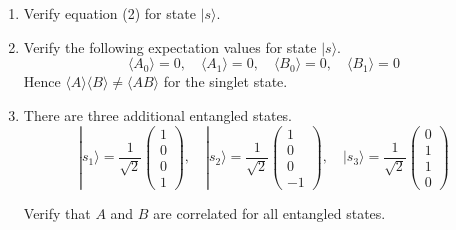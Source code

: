 \begin{enumerate}

\item
Verify equation (2) for state $|s\rangle$.

\item
Verify the following expectation values for state $|s\rangle$.
\begin{equation*}
\langle A_0\rangle=0,\quad\langle A_1\rangle=0,\quad\langle B_0\rangle=0,\quad\langle B_1\rangle=0
\end{equation*}
Hence $\langle A\rangle\langle B\rangle\ne\langle AB\rangle$ for the singlet state.

\item
There are three additional entangled states.
\begin{equation*}
|s_1\rangle=\frac{1}{\sqrt2}\begin{pmatrix}1\\0\\0\\1\end{pmatrix},\quad
|s_2\rangle=\frac{1}{\sqrt2}\begin{pmatrix}1\\0\\0\\-1\end{pmatrix},\quad
|s_3\rangle=\frac{1}{\sqrt2}\begin{pmatrix}0\\1\\1\\0\end{pmatrix}
\end{equation*}

Verify that $A$ and $B$ are correlated for all entangled states.

\end{enumerate}


